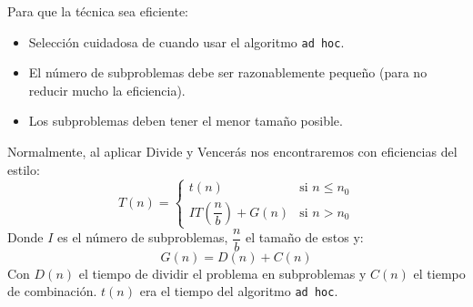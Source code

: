 Para que la técnica sea eficiente:
\begin{itemize}
    \item Selección cuidadosa de cuando usar el algoritmo \verb|ad hoc|.
    \item El número de subproblemas debe ser razonablemente pequeño (para no reducir mucho la eficiencia).
    \item Los subproblemas deben tener el menor tamaño posible.
\end{itemize}

Normalmente, al aplicar Divide y Vencerás nos encontraremos con eficiencias del estilo:
\begin{equation*}
    T(n) = \left\{ \begin{array}{ll}
            t(n) & \text{si\ } n \leq n_0\\
            IT\left(\dfrac{n}{b}\right) + G(n) & \text{si\ }n > n_0
    \end{array}\right.
\end{equation*}
Donde $I$ es el número de subproblemas, $\dfrac{n}{b}$ el tamaño de estos y:
\begin{equation*}
    G(n) = D(n) + C(n)
\end{equation*}
Con $D(n)$ el tiempo de dividir el problema en subproblemas y $C(n)$ el tiempo de combinación.
$t(n)$ era el tiempo del algoritmo \verb|ad hoc|.


